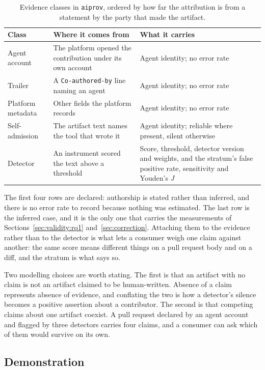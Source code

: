 \begin{table}[t]
\caption{Evidence classes in \texttt{aiprov}, ordered by how far the attribution is from
a statement by the party that made the artifact.}
\label{tab:evidence}
\small
\begin{tabular}{@{}p{}p{}p{}@{}}
\toprule
Class & Where it comes from & What it carries \\
\midrule
Agent account & The platform opened the contribution under its own account &
Agent identity; no error rate \\
\addlinespace
Trailer & A \texttt{Co-authored-by} line naming an agent &
Agent identity; no error rate \\
\addlinespace
Platform metadata & Other fields the platform records &
Agent identity; no error rate \\
\addlinespace
Self-admission & The artifact text names the tool that wrote it &
Agent identity; reliable where present, silent otherwise \\
\addlinespace
Detector & An instrument scored the text above a threshold &
Score, threshold, detector version and weights, and the stratum's false positive rate,
sensitivity and Youden's $J$ \\
\bottomrule
\end{tabular}
\end{table}

The first four rows are declared: authorship is stated rather than inferred, and there
is no error rate to record because nothing was estimated. The last row is the inferred
case, and it is the only one that carries the measurements of
Sections~\ref{sec:validity:rq1} and~\ref{sec:correction}. Attaching them to the evidence
rather than to the detector is what lets a consumer weigh one claim against another: the
same score means different things on a pull request body and on a diff, and the stratum
is what says so.

Two modelling choices are worth stating. The first is that an artifact with no claim is
not an artifact claimed to be human-written. Absence of a claim represents absence of
evidence, and conflating the two is how a detector's silence becomes a positive
assertion about a contributor. The second is that competing claims about one artifact
coexist. A pull request declared by an agent account and flagged by three detectors
carries four claims, and a consumer can ask which of them would survive on its own.

\subsection{Demonstration}
\label{sec:provenance:demo}

